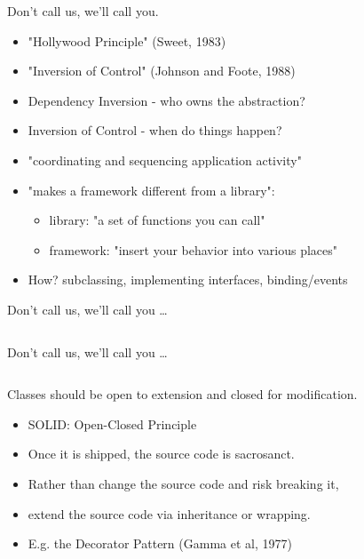 \documentclass{beamer}
\begin{document}
\begin{frame}{Don't call us, we'll call you.}
    \begin{itemize}
        \item "Hollywood Principle" (Sweet, 1983)
        \item "Inversion of Control" (Johnson and Foote, 1988)
        \item Dependency Inversion - who owns the abstraction?
        \item Inversion of Control - when do things happen?
        \item "coordinating and sequencing application activity"         
        \item "makes a framework different from a library":
            \begin{itemize}
                \item library: "a set of functions you can call"
                \item framework: "insert your behavior into various places"
            \end{itemize}
        \item How? subclassing, implementing interfaces, binding/events
    \end{itemize}
\end{frame}

\begin{frame}{Don't call us, we'll call you \ldots}
    \vspace{0cm}
    \begin{columns}
        \column{\dimexpr\paperwidth-40pt}
        
    \end{columns}
\end{frame}

\begin{frame}{Don't call us, we'll call you \ldots}
    \vspace{0cm}
    \begin{columns}
        \column{\dimexpr\paperwidth-40pt}
        
    \end{columns}
\end{frame}

\begin{frame}{Classes should be open to extension and closed for modification.}
    \begin{itemize}
        \item SOLID: Open-Closed Principle
        \item Once it is shipped, the source code is sacrosanct.
        \item Rather than change the source code and risk breaking it, 
        \item extend the source code via inheritance or wrapping. 
        \item E.g. the Decorator Pattern (Gamma et al, 1977)
    \end{itemize}
\end{frame}
\end{document}
